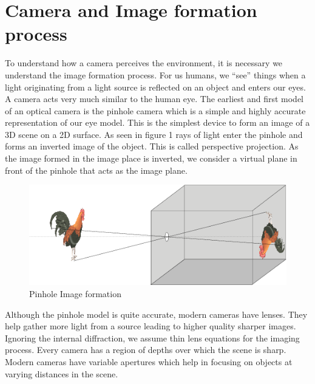 \section{Camera and Image formation process}
\label{imageFormation}

To understand how a camera perceives the environment, it is necessary we understand the image formation process. For us humans, we “see” things when a light originating from a light source is reflected on an object and enters our eyes. A camera acts very much similar to the human eye. The earliest and first model of an optical camera is the pinhole camera which is a simple and highly accurate representation of our eye model. This is the simplest device to form an image of a 3D scene on a 2D surface. As seen in figure 1 rays of light enter the pinhole and forms an inverted image of the object. This is called perspective projection. As the image formed in the image place is inverted, we consider a virtual plane in front of the pinhole that acts as the image plane.  

\begin{figure}[H]
  \includegraphics[width=\textwidth]{./figures/imageFormation.png}
\caption{Pinhole Image formation~\cite{imgFormBoomgaard}}
\label{fig:1}       %
\end{figure}

Although the pinhole model is quite accurate, modern cameras have lenses. They help gather more light from a source leading to higher quality sharper images. Ignoring the internal diffraction, we assume thin lens equations for the imaging process. Every camera has a region of depths over which the scene is sharp. Modern cameras have variable apertures which help in focusing on objects at varying distances in the scene.  

